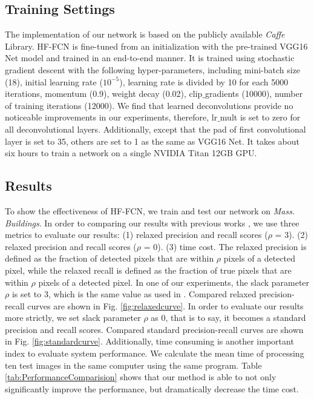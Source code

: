 \documentclass[runningheads]{llncs}
\begin{document}
\subsection{Training Settings}
   The implementation of our network is based on the publicly  available \textit{Caffe} \cite{Jia2014Caffe} Library. HF-FCN is fine-tuned from an initialization with the pre-trained VGG16 Net model and trained in an end-to-end manner. It is trained using stochastic gradient descent with the following hyper-parameters, including mini-batch size (18), initial learning rate ($10^{-5}$), learning rate is divided by 10 for each 5000 iterations, momentum (0.9), weight decay (0.02), clip$\_$gradients (10000), number of training iterations (12000). We find that learned deconvolutions provide no noticeable improvements in our experiments, therefore,  lr$\_$mult is set to zero for all deconvolutional layers. Additionally, except that the pad of first convolutional layer is set to 35, others are set to 1 as the  same as VGG16 Net. It takes about six hours to train a network on a single NVIDIA Titan 12GB GPU.

\subsection{Results}
    To show the effectiveness of HF-FCN, we train and test our network on \textit{Mass. Buildings}. In order to comparing our results with previous works \cite{Mnih2013Machine,Saito2016Multiple}, we use three metrics to evaluate our results: (1) relaxed precision and recall scores ($\rho$ = 3). (2) relaxed precision and recall scores ($\rho$ = 0). (3) time cost.  The relaxed precision is defined as the fraction of detected pixels that are within $\rho$ pixels of a detected pixel, while the relaxed recall is defined as the fraction of true pixels that are within $\rho$ pixels of a detected pixel.  In  one of our experiments, the slack parameter $\rho$ is set to 3, which is the same value as used in \cite{Mnih2013Machine,Saito2016Multiple}. Compared relaxed precision-recall curves are shown in  Fig. \ref{fig:relaxedcurve}. In order to evaluate our results more strictly, we set slack parameter $\rho$ as 0, that is to say, it becomes a standard precision and recall scores. Compared standard precision-recall curves are shown in  Fig. \ref{fig:standardcurve}. Additionally, time consuming is another important index to evaluate system performance. We calculate the mean time of processing ten test images in the same computer using the same program. Table \ref{tab:PerformanceComparision} shows that our method is able to not only significantly improve the performance, but dramatically decrease the time cost. 
      
\end{document}
